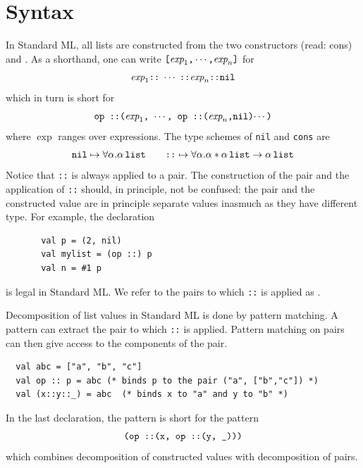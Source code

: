 \documentclass[12pt]{book}
\begin{document}
\section{Syntax}
\label{lsyn.sec}
In Standard ML, all lists are constructed 
from the two constructors \boxml{::} (read: cons)
and .   
As a shorthand, one can write $\hbox{\tt [}\hbox{\it exp}_1\hbox{\tt ,}\cdots
\hbox{\tt ,}\hbox{\it exp}_n\hbox{\tt ]}$ for
$$ \hbox{\it exp}_1\hbox{\tt ::}\; \cdots\; \hbox{\tt ::} \hbox{\it exp}_n\hbox{\tt ::}\hbox{\tt nil}$$
which in turn is short for
$$ \hbox{\tt op ::($\hbox{\it exp}_1$, $\cdots$, op ::($\hbox{\it exp}_n$,nil)$\cdots$)}$$
where $\exp$ ranges over expressions. 
The type schemes of {\tt nil} and {\tt cons} are
$$\hbox{\tt nil}\mapsto\forall\alpha.\alpha\,\hbox{\tt list}\qquad
  \hbox{\tt ::} \mapsto\forall\alpha.\alpha\ast\alpha\,\hbox{\tt list}\to\alpha\,\hbox{\tt list}
$$
Notice that  {\tt ::} is always applied to a pair. The construction
of the pair and the application of {\tt ::} should, in principle,  not be 
confused: the pair and the
constructed value are in principle separate values inasmuch as they have different
type.
For example, the declaration
\begin{verbatim}
       val p = (2, nil)
       val mylist = (op ::) p
       val n = #1 p
\end{verbatim}
is legal in Standard ML. We refer to the pairs to which {\tt ::} is applied
as .

Decomposition of list values in Standard ML is done by pattern matching.
A pattern can extract the pair to which {\tt ::} is applied. Pattern matching
on pairs can then give access to the components of the pair. 
\begin{verbatim}
  val abc = ["a", "b", "c"]
  val op :: p = abc (* binds p to the pair ("a", ["b","c"]) *)
  val (x::y::_) = abc  (* binds x to "a" and y to "b" *)
\end{verbatim}
In the last declaration, the pattern  is short for the pattern
$$\hbox{\tt (op ::(x, op ::(y, \_)))}$$ which combines decomposition of constructed
values with decomposition of pairs.
\end{document}
